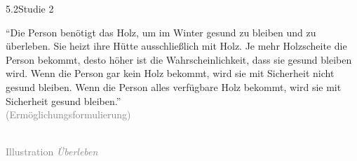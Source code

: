 \documentclass[xcolor=table,9pt,aspectratio=169]{beamer}
\begin{document}
\begin{frame}{\vspace*{10mm}5.2\hspace*{1em}Studie 2}
\begin{multicols}{2}
   \enquote{Die Person benötigt das Holz, um im Winter gesund zu bleiben und zu überleben. Sie heizt ihre Hütte ausschließlich mit Holz. Je mehr Holzscheite die Person bekommt, desto höher ist die Wahrscheinlichkeit, dass sie gesund bleiben wird. Wenn die Person gar kein Holz bekommt, wird sie mit Sicherheit nicht gesund bleiben. Wenn die Person alles verfügbare Holz bekommt, wird sie mit Sicherheit gesund bleiben.}\\
   \medskip
   \textcolor{gray}{(Ermöglichungsformulierung)}
   \vfill
   \begin{center}
      \\
      \textcolor{gray}{Illustration \textit{Überleben}}
   \end{center}
\end{multicols}
\end{frame}
\end{document}
